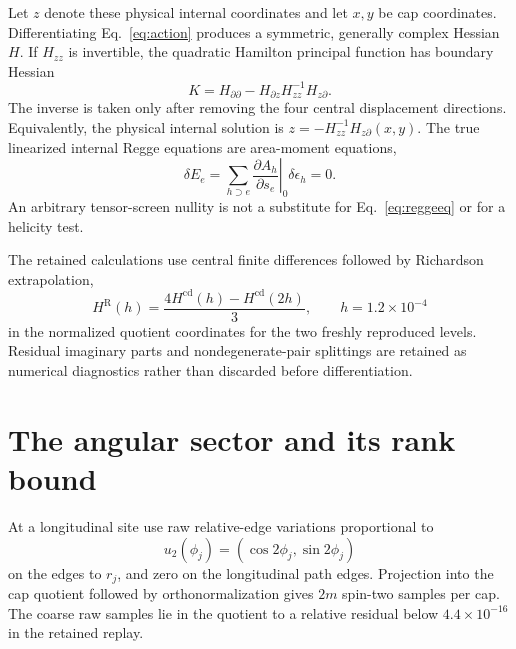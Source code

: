 \documentclass[11pt]{article}
\theoremstyle{remark}\newtheorem{remark}[theorem]{Remark}
\begin{document}
Let $z$ denote these physical internal coordinates and let $x,y$ be cap coordinates.
Differentiating Eq.~\eqref{eq:action} produces a symmetric, generally complex Hessian $H$.
If $H_{zz}$ is invertible, the quadratic Hamilton principal function has boundary Hessian
\begin{equation}
K=H_{\partial\partial}-H_{\partial z}H_{zz}^{-1}H_{z\partial}.
\label{eq:schur}
\end{equation}
The inverse is taken only after removing the four central displacement directions.
Equivalently, the physical internal solution is $z=-H_{zz}^{-1}H_{z\partial}(x,y)$.
The true linearized internal Regge equations are area-moment equations,
\begin{equation}
\delta E_e=\sum_{h\supset e}
\left.\frac{\partial A_h}{\partial s_e}\right|_0
\delta\epsilon_h=0.
\label{eq:reggeeq}
\end{equation}
An arbitrary tensor-screen nullity is not a substitute for Eq.~\eqref{eq:reggeeq} or for a helicity test.

The retained calculations use central finite differences followed by Richardson extrapolation,
\begin{equation}
H^{\mathrm R}(h)=\frac{4H^{\mathrm{cd}}(h)-H^{\mathrm{cd}}(2h)}3,
\qquad h=1.2\times10^{-4}
\label{eq:richardson}
\end{equation}
in the normalized quotient coordinates for the two freshly reproduced levels.
Residual imaginary parts and nondegenerate-pair splittings are retained as numerical diagnostics rather than discarded before differentiation.

\section{The angular sector and its rank bound}
\label{sec:rank}
At a longitudinal site use raw relative-edge variations proportional to
\begin{equation}
u_2(\phi_j)=(\cos 2\phi_j,\sin 2\phi_j)
\label{eq:e2}
\end{equation}
on the edges to $r_j$, and zero on the longitudinal path edges.
Projection into the cap quotient followed by orthonormalization gives $2m$ spin-two samples per cap.
The coarse raw samples lie in the quotient to a relative residual below $4.4\times10^{-16}$ in the retained replay.
\end{document}
